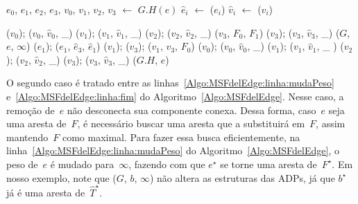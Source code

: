 \begin{algorithm}[hbt]
\caption{\MSFdelEdge($G$, $e$)}
\label{Algo:MSFdelEdge}
\begin{algorithmic}[1]
\State $e_0$, $e_1$, $e_2$, $e_3$, $v_0$, $v_1$, $v_2$, $v_3$ $\gets$ $G.H(e)$ \label{Algo:MSFdelEdge:linha:1}
\State $\hat e_i$ $\gets$ \LCOFindNode($e_i$)
\State $\hat v_i$ $\gets$ \LCOFindNode($v_i$)
\EndFor

\label{Algo:MSFdelEdge:linha2}

\State \LCOCycle($v_0$); \LCOSplit($v_0$, $\hat v_0$, \_)\label{Algo:MSFdelEdge:linha3}
\State \LCOCycle($v_1$); \LCOSplit($v_1$, $\hat v_1$, \_)\label{Algo:MSFdelEdge:c1:v1}
\State \LCOCycle($v_2$); \LCOSplit($v_2$, $\hat v_2$, \_)\label{Algo:MSFdelEdge:c1:v2}
\State \LCOSplit($v_3$, $F_0$, $F_1$) \label{Algo:MSFdelEdge:c1:split}
\State \LCOCycle($v_3$); \LCOSplit($v_3$, $\hat v_3$, \_)\label{Algo:MSFdelEdge:linha12}
\Else{}
\State \MSFupdate($G$, $e$, $\infty$)\label{Algo:MSFdelEdge:linha:mudaPeso}
\State \LCOCycle($e_1$); \LCOSplit($e_1$, $\hat e_3$, $\hat e_1$) \label{Algo:MSFdelEdge:linha:split}
\State \LCOCycle($v_1$); \LCOCycle($v_3$); \LCOMerge($v_1$, $v_3$, $F_0$) \label{Algo:MSFdelEdge:linha:merge}
\State \LCOCycle($v_0$); \LCOSplit($v_0$, $\hat v_0$, \_) \label{Algo:MSFdelEdge:linha:1cs}
\State \LCOCycle($v_1$); \LCOSplit($v_1$, $\hat v_1$, \_ )
\State \LCOCycle($v_2$); \LCOSplit($v_2$, $\hat v_2$, \_)
\State \LCOCycle($v_3$); \LCOSplit($v_3$, $\hat v_3$, \_)
	\label{Algo:MSFdelEdge:linha:ucs}
	\label{Algo:MSFdelEdge:linha:fim}
\EndIf
\State \LCODestroyOcto($G.H$, $e$)\label{Algo:MSFdelEdge:linha:desaloca}
\end{algorithmic}
\end{algorithm}

O segundo caso é tratado entre as linhas~\ref{Algo:MSFdelEdge:linha:mudaPeso} e~\ref{Algo:MSFdelEdge:linha:fim} do Algoritmo~\ref{Algo:MSFdelEdge}.
Nesse caso, a remoção de~$e$ não desconecta sua componente conexa.
Dessa forma, caso~$e$ seja uma aresta de~$F$, é necessário buscar uma aresta que a substituirá em~$F$, assim mantendo~$F$ como maximal.
Para fazer essa busca eficientemente, na linha~\ref{Algo:MSFdelEdge:linha:mudaPeso} do Algoritmo~\ref{Algo:MSFdelEdge}, o peso de~$e$ é mudado para~$\infty$, fazendo com que $e^\star$ se torne uma aresta de~$F^\star$. 
Em nosso exemplo, note que \MSFupdate($G$, $b$, $\infty$) não altera as estruturas das ADPs, já que $b^\star$ já é uma aresta de~$\hat T^\star$.

